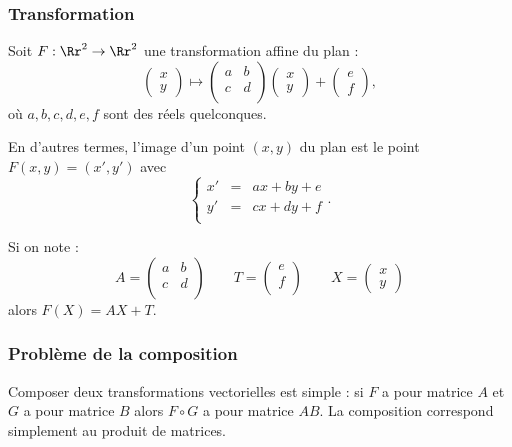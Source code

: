 \documentclass[11pt,class=report,crop=false]{standalone}
\begin{document}
\subsubsection{Transformation}


Soit $F: \Rr^2 \to \Rr^2$ une transformation affine du plan :
$$
\begin{pmatrix}x \\ y \end{pmatrix} \mapsto \begin{pmatrix}a & b \\ c & d \\  \end{pmatrix}
\begin{pmatrix}x \\ y \end{pmatrix} +\begin{pmatrix} e \\ f \end{pmatrix},$$
où $a,b,c,d, e, f$ sont des réels quelconques.

En d'autres termes, l'image d'un point $(x,y)$ du plan
est le point $F(x,y) = (x',y')$ avec
$$\left \{
\begin{array}{rcl}
    x' &=& ax + by + e \\
    y' &=& cx + dy + f \\
\end{array}
\right..$$

Si on note :
$$
A =\begin{pmatrix}a & b \\ c & d \\  \end{pmatrix}
\qquad 
T =\begin{pmatrix} e \\ f \\  \end{pmatrix}
\qquad X = \begin{pmatrix}x \\ y \end{pmatrix} $$
alors $F(X) = AX+T$.

\subsubsection{Problème de la composition}

Composer deux transformations vectorielles est simple : si $F$ a pour matrice $A$ et $G$ a pour matrice $B$ alors $F \circ G$ a pour matrice $AB$. La composition correspond simplement au produit de matrices.
\end{document}
